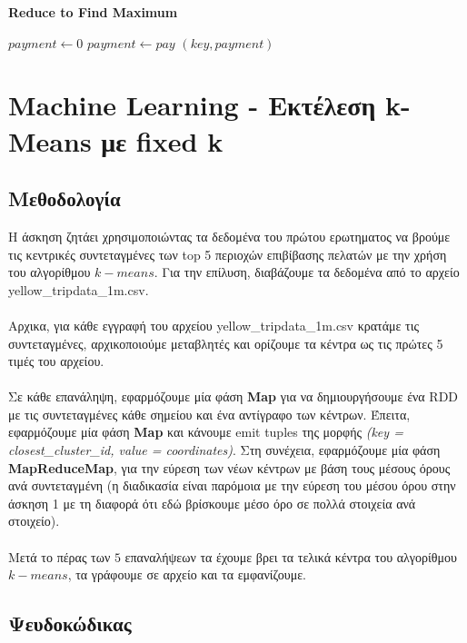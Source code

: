 \documentclass{ntua}
\begin{document}
\begin{algorithm}[H]
\caption*{\bfseries{Reduce to Find Maximum}}
\begin{algorithmic}[1]
	\State $payment \gets 0$
			\State $payment \gets pay$
		\EndIf
	\EndFor
	\Emit $(key, payment)$
	\EndFunction
\end{algorithmic}
\end{algorithm}

\newpage

\section{Machine Learning - Εκτέλεση k-Means με fixed k}

\subsection{Μεθοδολογία}
H άσκηση ζητάει χρησιμοποιώντας τα δεδομένα του πρώτου ερωτηματος να βρούμε τις κεντρικές συντεταγμένες των top 5 περιοχών επιβίβασης πελατών με την χρήση του αλγορίθμου $k-means$. Για την επίλυση, διαβάζουμε τα δεδομένα από το αρχείο yellow\_tripdata\_1m.csv. \\ \\
Αρχικα, για κάθε εγγραφή του αρχείου yellow\_tripdata\_1m.csv κρατάμε τις συντεταγμένες, αρχικοποιούμε μεταβλητές και ορίζουμε τα κέντρα ως τις πρώτες 5 τιμές του αρχείου.\\ \\ 
Σε κάθε επανάληψη, εφαρμόζουμε μία φάση \textbf{Map} για να δημιουργήσουμε ένα RDD με τις συντεταγμένες κάθε σημείου και ένα αντίγραφο των κέντρων. Έπειτα, εφαρμόζουμε μία φάση \textbf{Map} και κάνουμε emit tuples της μορφής \emph{(key = closest\_cluster\_id, value = coordinates)}. Στη συνέχεια, εφαρμόζουμε μία φάση \textbf{MapReduceMap}, για την εύρεση των νέων κέντρων με βάση τους μέσους όρους ανά συντεταγμένη (η διαδικασία είναι παρόμοια με την εύρεση του μέσου όρου στην άσκηση 1 με τη διαφορά ότι εδώ βρίσκουμε μέσο όρο σε πολλά στοιχεία ανά στοιχείο). \\ \\ 
Μετά το πέρας των $5$ επαναλήψεων τα έχουμε βρει τα τελικά κέντρα του αλγορίθμου $k-means$, τα γράφουμε σε αρχείο και τα εμφανίζουμε.

\subsection{Ψευδοκώδικας}
\end{document}
